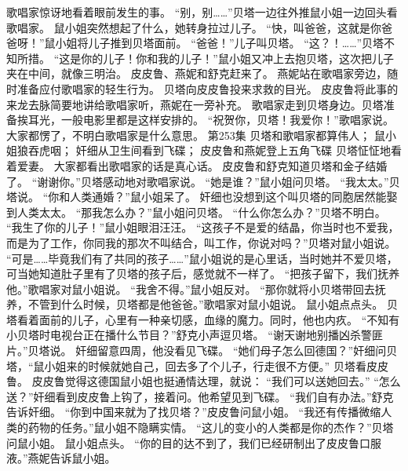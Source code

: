 \documentclass[a4paper,12pt,UTF8,twoside]{ctexbook}
\begin{document}
        歌唱家惊讶地看着眼前发生的事。  
        “别，别……”贝塔一边往外推鼠小姐一边回头看歌唱家。  
        鼠小姐突然想起了什么，她转身拉过儿子。  
        “快，叫爸爸，这就是你爸爸呀！”鼠小姐将儿子推到贝塔面前。  
        “爸爸！”儿子叫贝塔。  
        “这？！……”贝塔不知所措。  
        “这是你的儿子！你和我的儿子！”鼠小姐又冲上去抱贝塔，这次把儿子夹在中间，就像三明治。  
        皮皮鲁、燕妮和舒克赶来了。  
        燕妮站在歌唱家旁边，随时准备应付歌唱家的轻生行为。  
        贝塔向皮皮鲁投来求救的目光。  
        皮皮鲁将此事的来龙去脉简要地讲给歌唱家听，燕妮在一旁补充。  
        歌唱家走到贝塔身边。贝塔准备挨耳光，一般电影里都是这样安排的。  
        “祝贺你，贝塔！我爱你！”歌唱家说。  
        大家都愣了，不明白歌唱家是什么意思。          第253集  
        贝塔和歌唱家都算伟人；  
        鼠小姐狼吞虎咽；  
        奸细从卫生间看到飞碟；  
        皮皮鲁和燕妮登上五角飞碟    
        贝塔怔怔地看着爱妻。  
        大家都看出歌唱家的话是真心话。  
        皮皮鲁和舒克知道贝塔和金子结婚了。  
        “谢谢你。”贝塔感动地对歌唱家说。  
        “她是谁？”鼠小姐问贝塔。  
        “我太太。”贝塔说。  
        “你和人类通婚？”鼠小姐呆了。  
        奸细也没想到这个叫贝塔的同胞居然能娶到人类太太。  
        “那我怎么办？”鼠小姐问贝塔。  
        “什么你怎么办？”贝塔不明白。        
        “我生了你的儿子！”鼠小姐眼泪汪汪。  
        “这孩子不是爱的结晶，你当时也不爱我，而是为了工作，你同我的那次不叫结合，叫工作，你说对吗？”贝塔对鼠小姐说。  
        “可是……毕竟我们有了共同的孩子……”鼠小姐说的是心里话，当时她并不爱贝塔，可当她知道肚子里有了贝塔的孩子后，感觉就不一样了。  
        “把孩子留下，我们抚养他。”歌唱家对鼠小姐说。  
        “我舍不得。”鼠小姐反对。  
        “那你就将小贝塔带回去抚养，不管到什么时候，贝塔都是他爸爸。”歌唱家对鼠小姐说。  
        鼠小姐点点头。  
        贝塔看着面前的儿子，心里有一种亲切感，血缘的魔力。同时，他也内疚。  
        “不知有小贝塔时电视台正在播什么节目？”舒克小声逗贝塔。  
        “谢天谢地别播凶杀警匪片。”贝塔说。  
        奸细留意四周，他没看见飞碟。  
        “她们母子怎么回德国？”奸细问贝塔，“鼠小姐来的时候就她自己，回去多了个儿子，行走很不方便。”  
        贝塔看皮皮鲁。  
        皮皮鲁觉得这德国鼠小姐也挺通情达理，就说：        
        “我们可以送她回去。”  
        “怎么送？”奸细看到皮皮鲁上钩了，接着问。他希望见到飞碟。  
        “我们自有办法。”舒克告诉奸细。  
        “你到中国来就为了找贝塔？”皮皮鲁问鼠小姐。  
        “我还有传播微缩人类的药物的任务。”鼠小姐不隐瞒实情。  
        “这儿的变小的人类都是你的杰作？”贝塔问鼠小姐。  
        鼠小姐点头。  
        “你的目的达不到了，我们已经研制出了皮皮鲁口服液。”燕妮告诉鼠小姐。  
\end{document}
